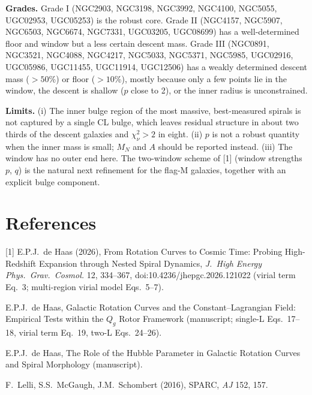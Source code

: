 \documentclass[10pt]{article}
\begin{document}
\textbf{Grades.} Grade I (NGC2903, NGC3198, NGC3992, NGC4100, NGC5055, UGC02953, UGC05253) is the robust core. Grade II (NGC4157, NGC5907, NGC6503, NGC6674, NGC7331, UGC03205, UGC08699) has a well-determined floor and window but a less certain descent mass. Grade III (NGC0891, NGC3521, NGC4088, NGC4217, NGC5033, NGC5371, NGC5985, UGC02916, UGC05986, UGC11455, UGC11914, UGC12506) has a weakly determined descent mass ($>50$\%) or floor ($>10$\%), mostly because only a few points lie in the window, the descent is shallow ($p$ close to 2), or the inner radius is unconstrained.

\textbf{Limits.} (i) The inner bulge region of the most massive, best-measured spirals is not captured by a single CL bulge, which leaves residual structure in about two thirds of the descent galaxies and $\chi^2_\nu>2$ in eight. (ii) $p$ is not a robust quantity when the inner mass is small; $M_N$ and $A$ should be reported instead. (iii) The window has no outer end here. The two-window scheme of [1] (window strengths $p$, $q$) is the natural next refinement for the flag-M galaxies, together with an explicit bulge component.

\section*{References}
\small
[1] E.P.J.\ de Haas (2026), From Rotation Curves to Cosmic Time: Probing High-Redshift Expansion through Nested Spiral Dynamics, \emph{J.\ High Energy Phys.\ Grav.\ Cosmol.} 12, 334--367, doi:10.4236/jhepgc.2026.121022 (virial term Eq.~3; multi-region virial model Eqs.~5--7).\par
[2] E.P.J.\ de Haas, Galactic Rotation Curves and the Constant--Lagrangian Field: Empirical Tests within the $Q_g$ Rotor Framework (manuscript; single-L Eqs.~17--18, virial term Eq.~19, two-L Eqs.~24--26).\par
[3] E.P.J.\ de Haas, The Role of the Hubble Parameter in Galactic Rotation Curves and Spiral Morphology (manuscript).\par
[4] F.\ Lelli, S.S.\ McGaugh, J.M.\ Schombert (2016), SPARC, \emph{AJ} 152, 157.
\end{document}
